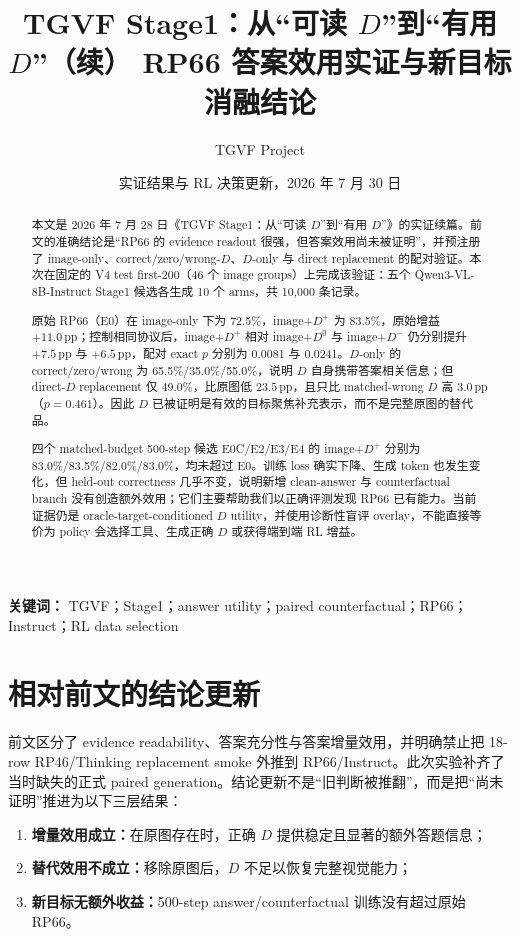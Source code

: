 \documentclass[UTF8,twocolumn,10pt,a4paper]{ctexart}
\title{\vspace{-1.0em}\textbf{TGVF Stage1：从“可读 $D$”到“有用 $D$”（续）\newline
RP66 答案效用实证与新目标消融结论}}
\author{TGVF Project}
\date{实证结果与 RL 决策更新，2026 年 7 月 30 日}
\newcommand{\Dpos}{D^{+}}
\newcommand{\Dzero}{D^{0}}
\newcommand{\Dwrong}{D^{-}}
\newcommand{\pp}{\,\mathrm{pp}}
\begin{document}
\maketitle
\vspace{-1.55em}

\begin{abstract}
本文是 2026 年 7 月 28 日《TGVF Stage1：从“可读 $D$”到“有用 $D$”》的实证续篇。前文的准确结论是“RP66 的 evidence readout 很强，但答案效用尚未被证明”，并预注册了 image-only、correct/zero/wrong-$D$、$D$-only 与 direct replacement 的配对验证。本次在固定的 V4 test first-200（46 个 image groups）上完成该验证：五个 Qwen3-VL-8B-Instruct Stage1 候选各生成 10 个 arms，共 10,000 条记录。

原始 RP66（E0）在 image-only 下为 72.5\%，image+$\Dpos$ 为 83.5\%，原始增益 $+11.0\pp$；控制相同协议后，image+$\Dpos$ 相对 image+$\Dzero$ 与 image+$\Dwrong$ 仍分别提升 $+7.5\pp$ 与 $+6.5\pp$，配对 exact $p$ 分别为 0.0081 与 0.0241。$D$-only 的 correct/zero/wrong 为 65.5\%/35.0\%/55.0\%，说明 $D$ 自身携带答案相关信息；但 direct-$D$ replacement 仅 49.0\%，比原图低 $23.5\pp$，且只比 matched-wrong $D$ 高 $3.0\pp$（$p=0.461$）。因此 $D$ 已被证明是有效的目标聚焦补充表示，而不是完整原图的替代品。

四个 matched-budget 500-step 候选 E0C/E2/E3/E4 的 image+$\Dpos$ 分别为 83.0\%/83.5\%/82.0\%/83.0\%，均未超过 E0。训练 loss 确实下降、生成 token 也发生变化，但 held-out correctness 几乎不变，说明新增 clean-answer 与 counterfactual branch 没有创造额外效用；它们主要帮助我们以正确评测发现 RP66 已有能力。当前证据仍是 oracle-target-conditioned $D$ utility，并使用诊断性盲评 overlay，不能直接等价为 policy 会选择工具、生成正确 $D$ 或获得端到端 RL 增益。
\end{abstract}

\noindent\textbf{关键词：} TGVF；Stage1；answer utility；paired counterfactual；RP66；Instruct；RL data selection

\section{相对前文的结论更新}

前文区分了 evidence readability、答案充分性与答案增量效用，并明确禁止把 18-row RP46/Thinking replacement smoke 外推到 RP66/Instruct。此次实验补齐了当时缺失的正式 paired generation。结论更新不是“旧判断被推翻”，而是把“尚未证明”推进为以下三层结果：
\begin{enumerate}
  \item \textbf{增量效用成立：}在原图存在时，正确 $D$ 提供稳定且显著的额外答题信息；
  \item \textbf{替代效用不成立：}移除原图后，$D$ 不足以恢复完整视觉能力；
  \item \textbf{新目标无额外收益：}500-step answer/counterfactual 训练没有超过原始 RP66。
\end{enumerate}
\end{document}

